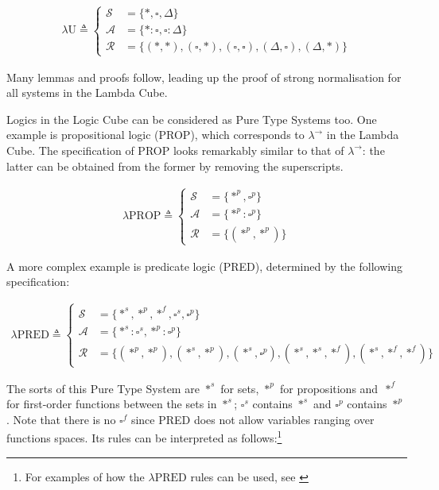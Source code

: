 \documentclass[12pt,toc=bibliography,numbers=noendperiod,
               footnotes=multiple,twoside]{scrartcl}
\begin{document}
\begin{align*}
\lambda\textrm{U} \triangleq
    \begin{cases}
        \mathcal{S} &= \{*,\square,\Delta\} \\
        \mathcal{A} &= \{*:\square,\square:\Delta\} \\
        \mathcal{R} &= \{(*,*),(\square,*),(\square,\square),(\Delta,\square),(\Delta,*)\}
    \end{cases}
\end{align*}

Many lemmas and proofs follow, leading up the proof of strong normalisation for all systems in the Lambda Cube.

Logics in the Logic Cube can be considered as Pure Type Systems too. One example is propositional logic (PROP), which corresponds to \(\lambda^{\rightarrow}\) in the Lambda Cube. The specification of PROP looks remarkably similar to that of \(\lambda^{\rightarrow}\): the latter can be obtained from the former by removing the superscripts.

\begin{align*}
\lambda\textrm{PROP} \triangleq
    \begin{cases}
        \mathcal{S} &= \{*^p,\square^p\} \\
        \mathcal{A} &= \{*^p:\square^p\} \\
        \mathcal{R} &= \{(*^p,*^p)\}
    \end{cases}
\end{align*}

A more complex example is predicate logic (PRED), determined by the following specification:

\begin{align*}
\lambda\textrm{PRED} \triangleq
    \begin{cases}
        \mathcal{S} &= \{*^s,*^p,*^f,\square^s,\square^p\} \\
        \mathcal{A} &= \{*^s:\square^s,*^p:\square^p\} \\
        \mathcal{R} &= \{(*^p,*^p),(*^s,*^p),(*^s,\square^p),(*^s,*^s,*^f),(*^s,*^f,*^f)\}
    \end{cases}
\end{align*}

The sorts of this Pure Type System are \(*^s\) for sets, \(*^p\) for propositions and~\(*^f\) for first-order functions between the sets in \(*^s\); \(\square^s\) contains \(*^s\) and \(\square^p\) contains \(*^p\). Note that there is no \(\square^f\) since PRED does not allow variables ranging over functions spaces. Its rules can be interpreted as follows:\footnote{For examples of how the \(\lambda\textrm{PRED}\) rules can be used, see \textcite[255]{barendregt_lambda_1992}}
\end{document}
